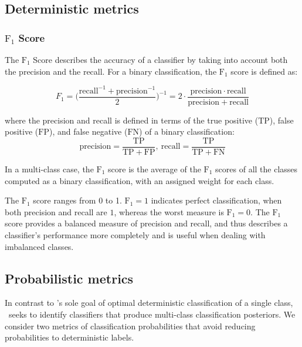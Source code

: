 \subsection{Deterministic metrics}
\subsubsection{$\mathrm{F_1}$ Score}

The $\mathrm{F_1}$ Score describes the accuracy of a classifier by taking into account both the precision and the recall. For a binary classification, the $\mathrm{F_1}$ score is defined as:

\begin{equation}
F_1 = \big(\frac{\mathrm{recall}^{-1} + \mathrm{precision}^{-1}}{2}\big)^{-1} = 2 \cdot \frac{\mathrm{precision}\cdot\mathrm{recall}}{\mathrm{precision} + \mathrm{recall}}
\end{equation}

where the precision and recall is defined in terms of the true positive ($\mathrm{TP}$), false positive ($\mathrm{FP}$), and false negative ($\mathrm{FN}$) of a binary classification: 
\begin{equation}
\mathrm{precision} = \frac{\mathrm{TP}}{\mathrm{TP}+\mathrm{FP}} ,\
\mathrm{recall} = \frac{\mathrm{TP}}{\mathrm{TP}+\mathrm{FN}}
\end{equation}

In a multi-class case, the $\mathrm{F_1}$ score is the average of the $\mathrm{F_1}$ scores of all the classes computed as a binary classification, with an assigned weight for each class.

The $\mathrm{F_1}$ score ranges from 0 to 1. $\mathrm{F_1}=1$ indicates perfect classification, when both precision and recall are $1$, whereas the worst measure is $\mathrm{F_1}=0$. The $\mathrm{F_1}$ score provides a balanced measure of precision and recall, and thus describes a classifier's performance more completely and is useful when dealing with imbalanced classes.
\subsection{Probabilistic metrics}
\label{sec:probabilistic}

In contrast to \snphotcc's sole goal of optimal deterministic classification of a single class, \plasticc\ seeks to identify classifiers that produce multi-class classification posteriors.
We consider two metrics of classification probabilities that avoid reducing probabilities to deterministic labels.


